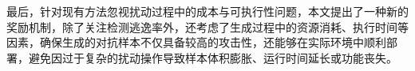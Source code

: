 最后，针对现有方法忽视扰动过程中的成本与可执行性问题，本文提出了一种新的奖励机制，除了关注检测逃逸率外，还考虑了生成过程中的资源消耗、执行时间等因素，确保生成的对抗样本不仅具备较高的攻击性，还能够在实际环境中顺利部署，避免因过于复杂的扰动操作导致样本体积膨胀、运行时间延长或功能丧失。








